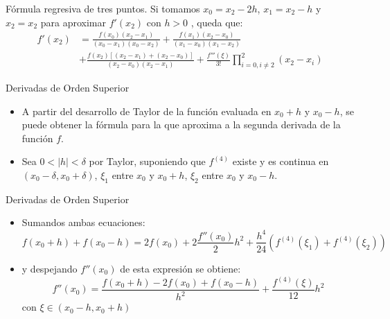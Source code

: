 \documentclass[12pt]{beamer}
\begin{document}
\begin{frame}{F\'ormula regresiva de tres puntos.}
Si tomamos $x_0 = x_2-2h$, $x_1 = x_2-h$ y $x_2 = x_2$ para aproximar $f'(x_2)$ con $h > 0$ , queda que:
\begin{align*}
f'(x_2) &=  \frac{f(x_0)(x_2-x_1)}{(x_0-x_1)(x_0-x_2)} + \frac{f(x_1)(x_2-x_0)}{(x_1-x_0)(x_1-x_2)}\\
 &+ \frac{f(x_2)[(x_2-x_1)+(x_2-x_0)]}{(x_2-x_0)(x_2-x_1)} + \frac{f'''(\xi)}{3!}\prod_{i=0,i\neq 2}^2(x_2-x_i)
\end{align*}
\end{frame}
\begin{frame}{Derivadas de Orden Superior}
  \begin{itemize}
    \item A partir del desarrollo de Taylor de la funci\'on evaluada en $x_0 + h$ y $x_0 - h$, se puede
    obtener la f\'ormula para la que aproxima a la segunda derivada de la funci\'on $f$.
    \item<2-> Sea $0<|h|<\delta$ por Taylor, suponiendo que $f^{(4)}$ existe y es continua en $(x_0-\delta,x_0+\delta)$, $\xi_1$ entre $x_0$ y $x_0+h$, $\xi_2$ entre $x_0$ y $x_0-h$.
  \end{itemize}
\end{frame}
\begin{frame}{Derivadas de Orden Superior}
  \begin{itemize}
    \item Sumandos ambas ecuaciones:
    {\small
    $$
     f(x_0+h) + f(x_0-h) = 2f(x_0) +2\dfrac{f''(x_0)}{2}h^2 + \dfrac{h^4}{24}\left(f^{(4)}(\xi_1)+f^{(4)}(\xi_2)\right)
     $$}
     \item y despejando $f''(x_0)$ de esta expresi\'on se obtiene:     
     $$
     f''(x_0) = \dfrac{f(x_0+h) - 2f(x_0) + f(x_0-h)}{h^2} + \dfrac{f^{(4)}(\xi)}{12}h^2 
    $$
    con $\xi \in (x_0-h,x_0+h)$
  \end{itemize}
\end{frame}
\end{document}
